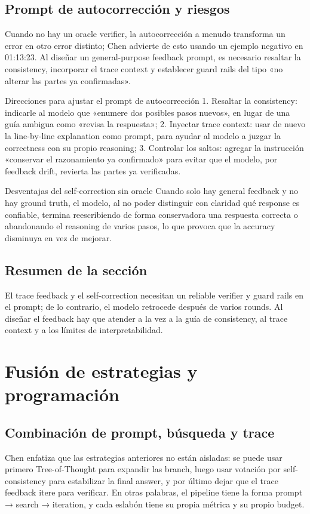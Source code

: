 \documentclass[a4paper]{article}
\begin{document}
\subsection{Prompt de autocorrección y riesgos}
Cuando no hay un oracle verifier, la autocorrección a menudo transforma un error en otro error distinto; Chen advierte de esto usando un ejemplo negativo en 01:13:23. Al diseñar un general-purpose feedback prompt, es necesario resaltar la consistency, incorporar el trace context y establecer guard rails del tipo «no alterar las partes ya confirmadas».

\begin{knowledgebox}{Direcciones para ajustar el prompt de autocorrección}
1. Resaltar la consistency: indicarle al modelo que «enumere dos posibles pasos nuevos», en lugar de una guía ambigua como «revisa la respuesta»; 2. Inyectar trace context: usar de nuevo la line-by-line explanation como prompt, para ayudar al modelo a juzgar la correctness con su propio reasoning; 3. Controlar los saltos: agregar la instrucción «conservar el razonamiento ya confirmado» para evitar que el modelo, por feedback drift, revierta las partes ya verificadas.
\end{knowledgebox}

\begin{warningbox}{Desventajas del self-correction sin oracle}
Cuando solo hay general feedback y no hay ground truth, el modelo, al no poder distinguir con claridad qué response es confiable, termina reescribiendo de forma conservadora una respuesta correcta o abandonando el reasoning de varios pasos, lo que provoca que la accuracy disminuya en vez de mejorar.
\end{warningbox}

\subsection{Resumen de la sección}
El trace feedback y el self-correction necesitan un reliable verifier y guard rails en el prompt; de lo contrario, el modelo retrocede después de varios rounds. Al diseñar el feedback hay que atender a la vez a la guía de consistency, al trace context y a los límites de interpretabilidad.
\section{Fusión de estrategias y programación}

\subsection{Combinación de prompt, búsqueda y trace}
Chen enfatiza que las estrategias anteriores no están aisladas: se puede usar primero Tree-of-Thought para expandir las branch, luego usar votación por self-consistency para estabilizar la final answer, y por último dejar que el trace feedback itere para verificar. En otras palabras, el pipeline tiene la forma prompt → search → iteration, y cada eslabón tiene su propia métrica y su propio budget.
\end{document}
